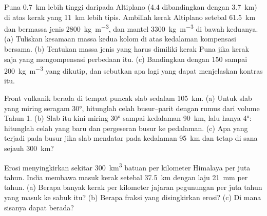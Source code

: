 \begin{exercise}[$\star\star\star$]\label{exo:b2:himalaya-andes:10}
Puna \qty{0.7}{km} lebih tinggi daripada Altiplano (4.4 dibandingkan dengan \qty{3.7}{km}) di atas kerak yang
\qty{11}{km} lebih tipis. Ambillah kerak Altiplano setebal \qty{61.5}{km} dan bermassa jenis
\qty{2800}{kg.m^{-3}}, dan mantel \qty{3300}{kg.m^{-3}} di bawah keduanya. (a) Tuliskan
kesamaan massa kedua kolom di atas kedalaman kompensasi bersama. (b) Tentukan
massa jenis yang harus dimiliki kerak Puna jika kerak saja yang mengompensasi perbedaan itu. (c) Bandingkan
dengan 150 sampai \qty{200}{kg.m^{-3}} yang dikutip, dan sebutkan apa lagi yang dapat menjelaskan kontras itu.
\end{exercise}

\begin{exercise}[$\star\star\star$]\label{exo:b2:himalaya-andes:11}
Front vulkanik berada di tempat puncak slab sedalam \qty{105}{km}. (a) Untuk slab yang
miring seragam \ang{30}, hitunglah celah busur--parit dengan rumus dari volume
Tahun 1. (b) Slab itu kini miring \ang{30} sampai kedalaman \qty{90}{km}, lalu hanya \ang{4}: hitunglah
celah yang baru dan pergeseran busur ke pedalaman. (c) Apa yang terjadi pada busur jika slab mendatar
pada kedalaman \qty{95}{km} dan tetap di sana sejauh \qty{300}{km}?
\end{exercise}

\begin{exercise}[$\star\star\star$]\label{exo:b2:himalaya-andes:12}
Erosi menyingkirkan sekitar \qty{300}{km^3} batuan per kilometer Himalaya per juta tahun.
India membawa masuk kerak setebal \qty{37.5}{km} dengan laju \qty{21}{mm} per tahun. (a) Berapa banyak kerak per
kilometer jajaran pegunungan per juta tahun yang masuk ke sabuk itu? (b) Berapa fraksi yang disingkirkan erosi?
(c) Di mana sisanya dapat berada?
\end{exercise}

